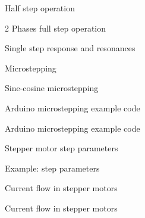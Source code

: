 \documentclass[compress]{beamer}
\begin{document}
{
    \begin{frame}{Half step operation}
    \end{frame}
}

{
    \begin{frame}{2 Phases full step operation}
    \end{frame}
}

{
    \begin{frame}{Single step response and resonances}
    \end{frame}
}

{
    \begin{frame}{Microstepping}
    \end{frame}
}

{
    \begin{frame}{Sine-cosine microstepping}
    \end{frame}
}

{
    \begin{frame}{Arduino microstepping example code}
    \end{frame}
}

{
    \begin{frame}{Arduino microstepping example code}
    \end{frame}
}

{
    \begin{frame}{Stepper motor step parameters}
    \end{frame}
}

{
    \begin{frame}{Example: step parameters}
    \end{frame}
}
{
    \begin{frame}{Current flow in stepper motors}
    \end{frame}
}

{
    \begin{frame}{Current flow in stepper motors}
    \end{frame}
}
\end{document}
